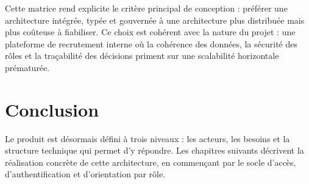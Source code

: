 Cette matrice rend explicite le critère principal de conception : préférer une architecture intégrée, typée et gouvernée à une architecture plus distribuée mais plus coûteuse à fiabiliser. Ce choix est cohérent avec la nature du projet : une plateforme de recrutement interne où la cohérence des données, la sécurité des rôles et la traçabilité des décisions priment sur une scalabilité horizontale prématurée.

\section*{Conclusion}
Le produit est désormais défini à trois niveaux : les acteurs, les besoins et la structure technique qui permet d'y répondre. Les chapitres suivants décrivent la réalisation concrète de cette architecture, en commençant par le socle d'accès, d'authentification et d'orientation par rôle.
